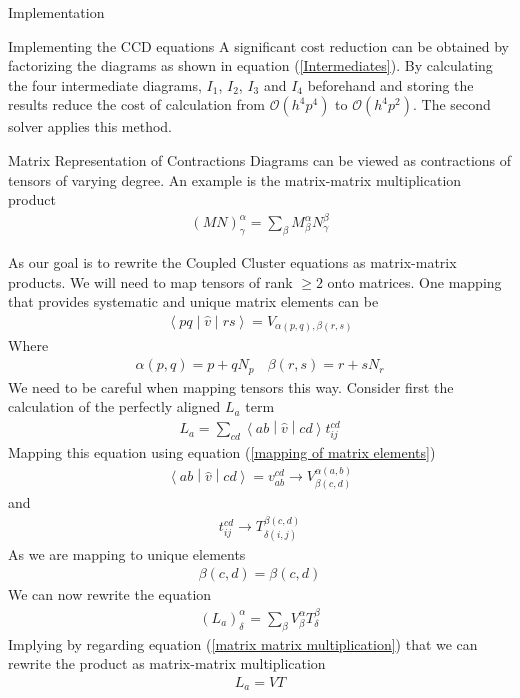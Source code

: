 \documentclass[twoside,english]{uiofysmaster}
\begin{document}
\begin{chapter}{Implementation}
\begin{section}{Implementing the CCD equations}
		A significant cost reduction can be obtained by factorizing the diagrams as shown in equation (\ref{Intermediates}). By calculating the four intermediate diagrams, $I_1$, $I_2$, $I_3$ and $I_4$ beforehand and storing the results reduce the cost of calculation from $\mathcal{O}(h^4 p^4)$ to $\mathcal{O}(h^4 p^2)$. The second solver applies this method. 

	\end{section}

	\begin{section}{Matrix Representation of Contractions}
		Diagrams can be viewed as contractions of tensors of varying degree. An example is the matrix-matrix multiplication product
		\begin{align}
		 	\left( M N \right)_{\gamma}^{\alpha} = \sum_{\beta} M_{\beta}^\alpha N_\gamma^\beta 
		 	\label{matrix matrix multiplication}
		\end{align} 

		As our goal is to rewrite the Coupled Cluster equations as matrix-matrix products. We will need to map tensors of rank $\geq 2$ onto matrices. One mapping that provides systematic and unique matrix elements can be 
		\begin{align}
			\left<pq\middle| \hat v\middle|rs\right> = V_{\alpha(p,q),\beta(r,s)}
		\end{align}
		Where 
		\begin{align}
			\alpha(p,q) = p + q N_p \;\,\:\; \beta(r,s) = r + s N_r
			\label{mapping of matrix elements}
		\end{align}
		We need to be careful when mapping tensors this way. Consider first the calculation of the perfectly aligned $L_a$ term
		\begin{align}
			L_a = \sum_{cd} \left< ab \middle| \hat v\middle|cd\right> t_{ij}^{cd}
		\end{align}
		Mapping this equation using equation (\ref{mapping of matrix elements})
		\begin{align}
			\left< ab \middle| \hat v\middle|cd\right> = v_{ab}^{cd} \rightarrow V_{\beta(c,d)}^{\alpha(a,b)}
		\end{align}
		and
		\begin{align}
			t_{ij}^{cd} \rightarrow T_{\delta(i,j)}^{\beta(c,d)}
		\end{align}
		As we are mapping to unique elements 
		\begin{align}
			\beta(c,d) = \beta(c,d)
		\end{align}
		We can now rewrite the equation 
		\begin{align}
			(L_a)_ \delta^\alpha = \sum_ \beta V_ \beta^\alpha T_ \delta^\beta
		\end{align}
		Implying by regarding equation (\ref{matrix matrix multiplication}) that we can rewrite the product as matrix-matrix multiplication 
		\begin{align}
			L_a = VT
		\end{align}


\end{section}
\end{chapter}
\end{document}
